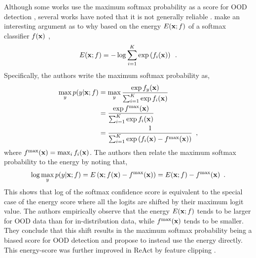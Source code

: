 Although some works use the maximum softmax probability as a score for OOD detection \parencite{hendrycks_deep_2019,ren_likelihood_2019}, several works have noted that it is not generally reliable \parencite{hendrycks_scaling_2022,liu_energybased_2020}. 
\textcite{liu_energybased_2020} make an interesting argument as to why based on the energy $E({\mathbf{x}}; f)$ of a softmax classifier $f({\mathbf{x}})$ \parencite{lecun_tutorial_2006},
%
\begin{equation} \label{eq:softmax-classifier-energy}
    E(\xb; f) = - \log \sum_{i=1}^K \exp \left( f_i(\xb) \right) \enspace .
\end{equation}
%
Specifically, the authors write the maximum softmax probability as,
%
\begin{align} \label{eq:softmax-classifier-maximum-probability}
    \max_y p(y|\xb;f) 
    &= \max_y \frac{\exp f_y(\xb)}{\sum_{i=1}^K \exp f_i(\xb)} \nonumber \\
    &= \frac{\exp f^\text{max}(\xb)}{\sum_{i=1}^K \exp f_i(\xb)} \nonumber \\
    &= \frac{1}{\sum_{i=1}^K \exp \left(f_i(\xb) - f^\text{max}(\xb)\right)} \enspace ,
\end{align}
where $f^\text{max}({\mathbf{x}}) = \max_i f_i({\mathbf{x}})$. 
The authors then relate the maximum softmax probability to the energy by noting that,
%
\begin{align}
    \log \max_y p(y|{\mathbf{x}};f) = E\left({\mathbf{x}}; f({\mathbf{x}}) - f^\text{max}({\mathbf{x}})\right) = E({\mathbf{x}}; f) - f^\text{max}({\mathbf{x}}) \enspace .
\end{align}
%
This shows that log of the softmax confidence score is equivalent to the special case of the energy score where all the logits are shifted by their maximum logit value. 
The authors empirically observe that the energy $E({\mathbf{x}}; f)$ tends to be larger for OOD data than for in-distribution data, while $f^\text{max}({\mathbf{x}})$ tends to be smaller. 
They conclude that this shift results in the maximum softmax probability being a biased score for OOD detection and propose to instead use the energy directly. This energy-score was further improved in ReAct by feature clipping \parencite{sun_react_2021}. 

